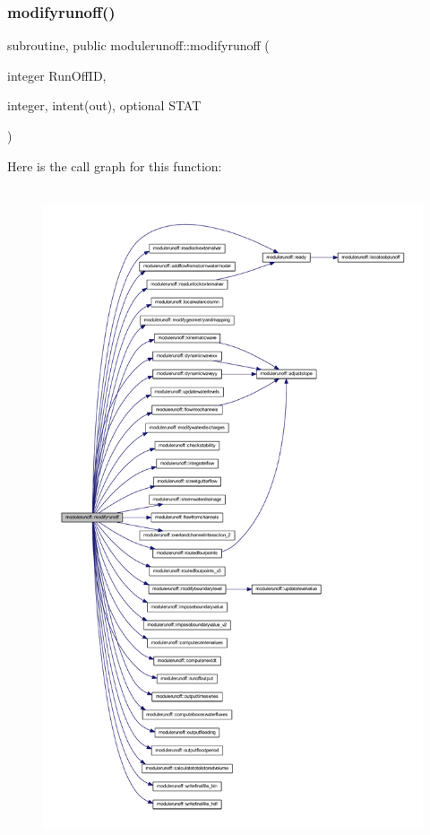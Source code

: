 \subsubsection{\texorpdfstring{modifyrunoff()}{modifyrunoff()}}
{\footnotesize\ttfamily subroutine, public modulerunoff\+::modifyrunoff (\begin{DoxyParamCaption}\item[{integer}]{Run\+Off\+ID,  }\item[{integer, intent(out), optional}]{S\+T\+AT }\end{DoxyParamCaption})}

Here is the call graph for this function\+:\nopagebreak
\begin{figure}[H]
\begin{center}
\leavevmode
\includegraphics[height=550pt]{namespacemodulerunoff_a43ce9e041625ab643d74cc279ddf43db_cgraph}
\end{center}
\end{figure}
\mbox{\label{namespacemodulerunoff_aadda9f593eae7a9fbebc7ae31f4e847b}} 
